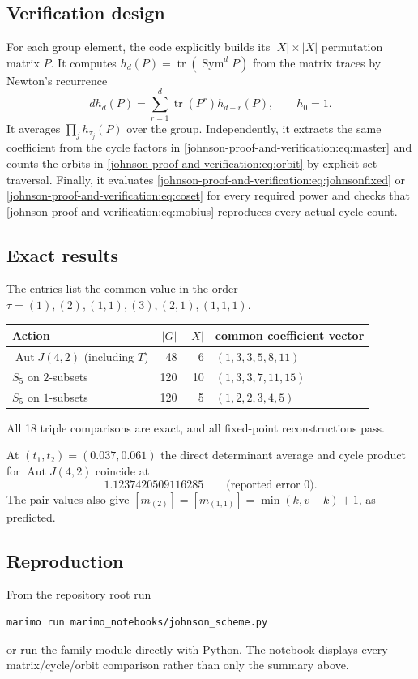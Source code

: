\documentclass[10pt]{article}
\newcommand{\Sym}{\operatorname{Sym}}
\newcommand{\Aut}{\operatorname{Aut}}
\begin{document}
\subsection{Verification design}
For each group element, the code explicitly builds its $|X|\times|X|$
permutation matrix $P$.  It computes $h_d(P)=\operatorname{tr}(\Sym^dP)$ from
the matrix traces by Newton's recurrence
\[
 d h_d(P)=\sum_{r=1}^d\operatorname{tr}(P^r)h_{d-r}(P),\qquad h_0=1.
\]
It averages $\prod_j h_{\tau_j}(P)$ over the group.  Independently, it
extracts the same coefficient from the cycle factors in \eqref{johnson-proof-and-verification:eq:master}
and counts the orbits in \eqref{johnson-proof-and-verification:eq:orbit} by explicit set traversal.  Finally,
it evaluates \eqref{johnson-proof-and-verification:eq:johnsonfixed} or \eqref{johnson-proof-and-verification:eq:coset} for every required
power and checks that \eqref{johnson-proof-and-verification:eq:mobius} reproduces every actual cycle count.

\subsection{Exact results}
The entries list the common value in the order
$\tau=(1),(2),(1,1),(3),(2,1),(1,1,1)$.
\begin{center}
\begin{tabular}{@{}lrrl@{}}
\toprule
Action & $|G|$ & $|X|$ & common coefficient vector\\
\midrule
$\Aut J(4,2)$ (including $T$) & 48 & 6 & $(1,3,3,5,8,11)$\\
$S_5$ on $2$-subsets & 120 & 10 & $(1,3,3,7,11,15)$\\
$S_5$ on $1$-subsets & 120 & 5 & $(1,2,2,3,4,5)$\\
\bottomrule
\end{tabular}
\end{center}
All 18 triple comparisons are exact, and all fixed-point reconstructions pass.

At $(t_1,t_2)=(0.037,0.061)$ the direct determinant average and cycle product
for $\Aut J(4,2)$ coincide at
\[
1.1237420509116285\qquad\text{(reported error $0$)}.
\]
The pair values also give $[m_{(2)}]=[m_{(1,1)}]=\min(k,v-k)+1$, as predicted.

\subsection{Reproduction}
From the repository root run
\begin{verbatim}
marimo run marimo_notebooks/johnson_scheme.py
\end{verbatim}
or run the family module directly with Python.  The notebook displays every
matrix/cycle/orbit comparison rather than only the summary above.
\endgroup
\end{document}
